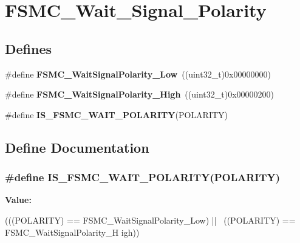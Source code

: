 \hypertarget{group__FSMC__Wait__Signal__Polarity}{
\section{FSMC\_\-Wait\_\-Signal\_\-Polarity}
\label{group__FSMC__Wait__Signal__Polarity}
}
\subsection*{Defines}
\begin{DoxyCompactItemize}
\item 
\hypertarget{group__FSMC__Wait__Signal__Polarity_ga7dc72fdfc6225e5daa9b8efee8dff49f}{
\#define {\bfseries FSMC\_\-WaitSignalPolarity\_\-Low}~((uint32\_\-t)0x00000000)}
\label{group__FSMC__Wait__Signal__Polarity_ga7dc72fdfc6225e5daa9b8efee8dff49f}

\item 
\hypertarget{group__FSMC__Wait__Signal__Polarity_ga3418f29249a261edb1359d1bcdc43661}{
\#define {\bfseries FSMC\_\-WaitSignalPolarity\_\-High}~((uint32\_\-t)0x00000200)}
\label{group__FSMC__Wait__Signal__Polarity_ga3418f29249a261edb1359d1bcdc43661}

\item 
\#define {\bfseries IS\_\-FSMC\_\-WAIT\_\-POLARITY}(POLARITY)
\end{DoxyCompactItemize}


\subsection{Define Documentation}
\hypertarget{group__FSMC__Wait__Signal__Polarity_gabc5321807d5184fe5cdb7848e1be7bc6}{
\subsubsection[{IS\_\-FSMC\_\-WAIT\_\-POLARITY}]{\setlength{\rightskip}{0pt plus 5cm}\#define IS\_\-FSMC\_\-WAIT\_\-POLARITY(POLARITY)}}
\label{group__FSMC__Wait__Signal__Polarity_gabc5321807d5184fe5cdb7848e1be7bc6}
{\bfseries Value:}
\begin{DoxyCode}
(((POLARITY) == FSMC_WaitSignalPolarity_Low) || \
                                         ((POLARITY) == FSMC_WaitSignalPolarity_H
      igh))
\end{DoxyCode}
